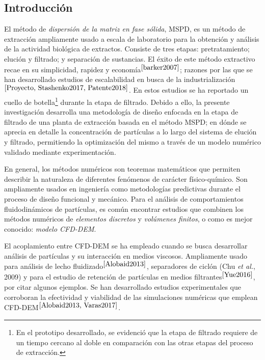 \begin{center}
	\section{Introducci\'on}
\end{center}

\noindent
\justify

El m\'etodo de \textit{dispersi\'on de la matriz en fase s\'olida}, MSPD, es un m\'etodo de extracci\'on ampliamente usado a escala de laboratorio para la obtenci\'on y an\'alisis de la actividad biol\'ogica de extractos. Consiste de tres etapas: pretratamiento; eluci\'on y filtrado; y separaci\'on de sustancias. El \'exito de este m\'etodo extractivo recae en su simplicidad, rapidez y econom\'ia$^{\cite{barker2007}}$; razones por las que se han desarrollado estudios de escalabilidad en busca de la industrializaci\'on$^{\cite{Proyecto, Stashenko2017, Patente2018}}$. En estos estudios se ha reportado un cuello de botella\footnote{En el prototipo desarrollado, se evidenci\'o que la etapa de filtrado requiere de un tiempo cercano al doble en comparaci\'on con las otras etapas del proceso de extracci\'on.} durante la etapa de filtrado. Debido a ello, la presente investigaci\'on desarrolla una metodolog\'ia de dise\~no enfocada en la etapa de filtrado de una planta de extracci\'on basada en el m\'etodo MSPD; en d\'onde se aprecia en detalle la concentraci\'on de part\'iculas a lo largo del sistema de eluci\'on y filtrado, permitiendo la optimizaci\'on del mismo a trav\'es de un modelo num\'erico validado mediante experimentaci\'on.

\noindent
\justify

En general, los m\'etodos num\'ericos son teoremas matem\'aticos que permiten describir la naturaleza de diferentes fen\'omenos de car\'acter f\'isico-qu\'imico. Son ampliamente usados en ingenier\'ia como metodolog\'ias predictivas durante el proceso de dise\~no funcional y mec\'anico. Para el an\'alisis de comportamientos fluidodin\'amicos de part\'iculas, es com\'un encontrar estudios que combinen los m\'etodos num\'ericos de \textit{elementos discretos} y \textit{vol\'umenes finitos}, o como es mejor conocido: \textit{modelo CFD-DEM}.

\noindent
\justify

El acoplamiento entre CFD-DEM se ha empleado cuando se busca desarrollar an\'alisis de part\'iculas y su interacci\'on en medios viscosos. Ampliamente usado para an\'alisis de lecho fluidizado$^{\cite{Alobaid2013}}$, separadores de cicl\'on (Chu \textit{et al.}, 2009) y para el estudio de retenci\'on de part\'iculas en medios filtrantes$^{\cite{Yue2016}}$, por citar algunos ejemplos. Se han desarrollado estudios experimentales que corroboran la efectividad y viabilidad de las simulaciones num\'ericas que emplean CFD-DEM$^{\cite{Alobaid2013, Varas2017}}$.

\noindent
\justify

